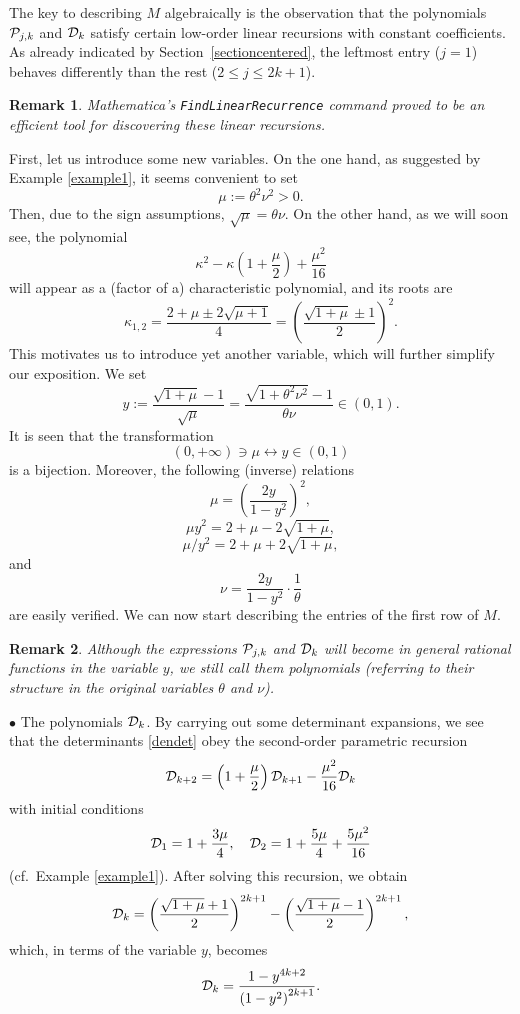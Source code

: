\documentclass[smallextended,numbook,runningheads]{svjour3}     %
\newtheorem{remark}{Remark}
\newtheorem{remark}{Remark}
\newcommand{\te}{\theta}
\newcommand{\cP}{{\cal{P}}}
\newcommand{\cD}{{\cal{D}}}
\begin{document}
The key to describing $M$ algebraically is the observation that the polynomials $\cP_{j,k}$ and $\cD_{k}$ satisfy certain low-order linear recursions with constant coefficients. As already indicated by Section~\ref{sectioncentered}, the leftmost entry ($j=1$) behaves differently than the rest ($2\le j\le 2k+1$).


\begin{remark}
 \textit{Mathematica}'s  {\tt{FindLinearRecurrence}} command proved to be an efficient tool for discovering these linear recursions. 
\end{remark}
First, let us introduce some new variables. On the one hand, as suggested by Example \ref{example1}, it seems convenient to set
\[
\mu:=\te^2\nu^2>0.
\]
Then, due to the sign assumptions, $\sqrt{\mu}=\te\nu$. On the other hand, as we will soon see, the polynomial 
\[
\kappa ^2-\kappa  \left(1+\frac{\mu }{2}\right)+\frac{\mu ^2}{16}
\]
will appear as a (factor of a) characteristic polynomial, and its roots are
\begin{equation}\label{kappa12}
\kappa_{1,2}=\frac{2+\mu \pm 2 \sqrt{\mu +1}}{4}=\left(\frac{\sqrt{1+\mu}\pm 1}{2}\right)^2.
\end{equation}
This motivates us to introduce yet another variable, which will further simplify our exposition. We set
\begin{equation}\label{ydef01}
y:=\frac{\sqrt{1+\mu}-1}{\sqrt{\mu}}=\frac{\sqrt{1+\te^2\nu^2}-1}{\te\nu}\in (0,1).
\end{equation}
It is seen that the transformation
\[
(0,+\infty)\ni\mu \longleftrightarrow y\in(0,1)
\]
is a bijection. Moreover, the following (inverse) relations 
\[
\mu=\left(\frac{2y}{1-y^2}\right)^2,
\]
\[\mu y^2=2+\mu-2\sqrt{1+\mu},\]
\[\mu/y^2=2+\mu+2\sqrt{1+\mu},\]
and
\begin{equation}\label{fromytonu}
\nu=\frac{2y}{1-y^2}\cdot\frac{1}{\te}
\end{equation}
are easily verified. We can now start describing the entries of the first row of $M$.
\begin{remark}
Although the expressions $\cP_{j,k}$ and $\cD_{k}$ will become in general rational functions in the variable $y$, we still call them polynomials (referring to their structure in the original variables $\te$ and $\nu$). 
\end{remark}
$\bullet$ The polynomials $\cD_k$. By carrying out some determinant expansions, we see that the determinants \eqref{dendet} obey the second-order parametric recursion
\begin{equation}\label{Dkrec}
\cD_{k+2}=\left(1+\frac{\mu}{2}\right)\cD_{k+1}-\frac{\mu^2}{16}\cD_k
\end{equation}
with initial conditions
\[
\cD_1=1+\frac{3\mu}{4}, \quad \cD_2=1+\frac{5\mu}{4}+\frac{5\mu^2}{16}
\]
(cf.~Example \ref{example1}). After solving this recursion, we obtain
\[
\cD_k=\left(\frac{\sqrt{1+\mu}+1}{2}\right)^{2 k+1}- \left(\frac{\sqrt{1+\mu}-1}{2}\right)^{2 k+1},
\]
which, in terms of the variable $y$, becomes
\begin{equation}\label{expldet}
\cD_k=\frac{1-y^{4 k+2}}{\left(1-y^2\right)^{2 k+1} }.
\end{equation}
\end{document}
